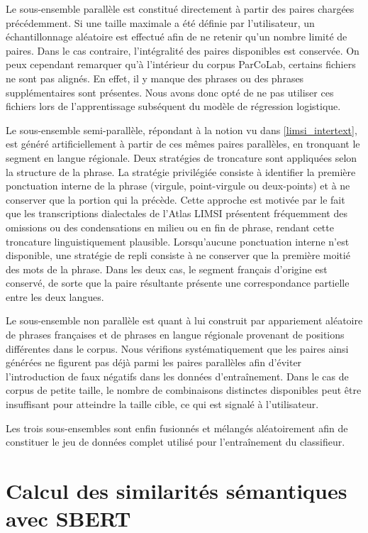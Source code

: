 Le sous-ensemble parallèle est constitué directement à partir des paires chargées précédemment. Si une 
taille maximale a été définie par l'utilisateur, un échantillonnage aléatoire est effectué afin de ne 
retenir qu'un nombre limité de paires. Dans le cas contraire, l'intégralité des paires disponibles est 
conservée. On peux cependant remarquer qu'à l'intérieur du corpus ParCoLab, certains fichiers ne sont pas alignés.
En effet, il y manque des phrases ou des phrases supplémentaires sont présentes. Nous avons donc opté de ne pas
utiliser ces fichiers lors de l'apprentissage subséquent du modèle de régression logistique.

Le sous-ensemble semi-parallèle, répondant à la notion vu dans \ref{limsi_intertext}, est généré artificiellement
à partir de ces mêmes paires parallèles, en 
tronquant le segment en langue régionale. Deux stratégies de troncature sont appliquées selon la structure 
de la phrase. La stratégie privilégiée consiste à identifier la première ponctuation interne de la phrase 
(virgule, point-virgule ou deux-points) et à ne conserver que la portion qui la précède. Cette approche est 
motivée par le fait que les transcriptions dialectales de l'Atlas LIMSI présentent fréquemment des omissions 
ou des condensations en milieu ou en fin de phrase, rendant cette troncature linguistiquement plausible. 
Lorsqu'aucune ponctuation interne n'est disponible, une stratégie de repli consiste à ne conserver que la 
première moitié des mots de la phrase. Dans les deux cas, le segment français d'origine est conservé, 
de sorte que la paire résultante présente une correspondance partielle entre les deux langues.

Le sous-ensemble non parallèle est quant à lui construit par appariement aléatoire de phrases françaises et 
de phrases en langue régionale provenant de positions différentes dans le corpus. Nous vérifions
systématiquement que les paires ainsi générées ne figurent pas déjà parmi les paires parallèles afin d'éviter 
l'introduction de faux négatifs dans les données d'entraînement. Dans le cas de corpus de petite taille, le 
nombre de combinaisons distinctes disponibles peut être insuffisant pour atteindre la taille cible, ce qui est 
signalé à l'utilisateur.

Les trois sous-ensembles sont enfin fusionnés et mélangés aléatoirement afin de constituer le jeu de 
données complet utilisé pour l'entraînement du classifieur.

\section{Calcul des similarités sémantiques avec SBERT}

